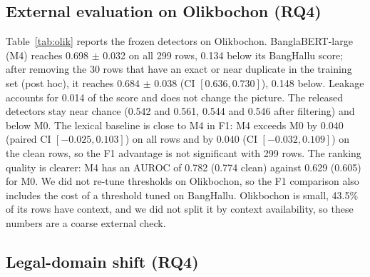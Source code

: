 \documentclass[manuscript,screen,review]{acmart}
\newcommand{\fit}[1]{\resizebox{\ifdim\width>\linewidth\linewidth\else\width\fi}{!}{#1}}
\begin{document}
\subsection{External evaluation on Olikbochon (RQ4)}\label{sec:olik}
Table~\ref{tab:olik} reports the frozen detectors on Olikbochon. BanglaBERT-large (M4) reaches 0.698 $\pm$ 0.032 on all 299 rows, 0.134 below its BangHallu score; after removing the 30 rows that have an exact or near duplicate in the training set (post hoc), it reaches 0.684 $\pm$ 0.038 (CI $[0.636, 0.730]$), 0.148 below. Leakage accounts for 0.014 of the score and does not change the picture. The released detectors stay near chance (0.542 and 0.561, 0.544 and 0.546 after filtering) and below M0. The lexical baseline is close to M4 in F1: M4 exceeds M0 by 0.040 (paired CI $[-0.025, 0.103]$) on all rows and by 0.040 (CI $[-0.032, 0.109]$) on the clean rows, so the F1 advantage is not significant with 299 rows. The ranking quality is clearer: M4 has an AUROC of 0.782 (0.774 clean) against 0.629 (0.605) for M0. We did not re-tune thresholds on Olikbochon, so the F1 comparison also includes the cost of a threshold tuned on BangHallu. Olikbochon is small, 43.5\% of its rows have context, and we did not split it by context availability, so these numbers are a coarse external check.

\begin{table}[t]
\caption{External evaluation on Olikbochon with frozen BangHallu thresholds: M4 ranks better than the lexical baseline (AUROC) but its F1 advantage is not significant. ``Clean'' removes the 30 rows with an exact or near-duplicate in the training set (post hoc). Gap is the clean Olikbochon F1 minus the BangHallu F1.}
\label{tab:olik}
\small
\fit{}
\end{table}

\subsection{Legal-domain shift (RQ4)}\label{sec:legal}
\end{document}

